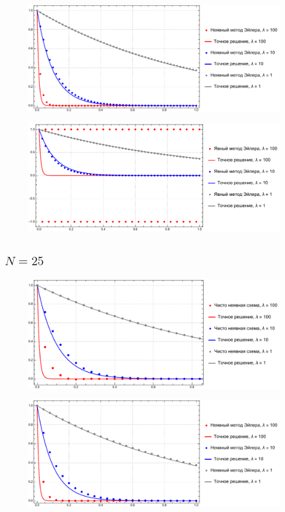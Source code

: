 \documentclass[
11pt,
master, %
subf, %
href, %
colorlinks=true, %
times, %
]{disser}
\begin{document}
\begin{figure}[h!]
  \centering
  \includegraphics[width=0.8\linewidth]{pl502}
  \caption{}\label{ris:5}
\end{figure}

\begin{figure}[h!]
  \centering
  \includegraphics[width=0.8\linewidth]{pl503}
  \caption{}\label{ris:6}
\end{figure}

\subsection{$N=25$}

\begin{figure}[h!]
  \centering
  \includegraphics[width=0.8\linewidth]{pl251}
  \caption{}\label{ris:7}
\end{figure}

\begin{figure}[h!]
  \centering
  \includegraphics[width=0.8\linewidth]{pl253}
  \caption{}\label{ris:8}
\end{figure}
\end{document}
